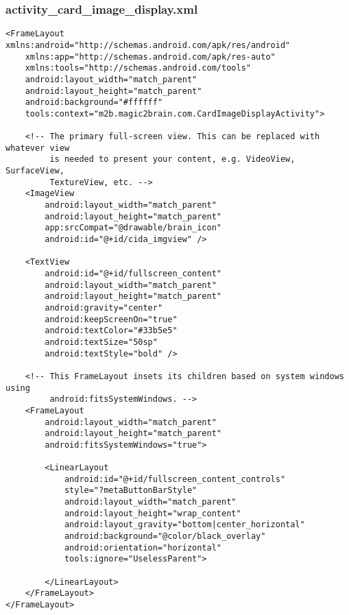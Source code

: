 \subsubsection*{activity\_card\_image\_display.xml}
\begin{lstlisting}
<FrameLayout xmlns:android="http://schemas.android.com/apk/res/android"
    xmlns:app="http://schemas.android.com/apk/res-auto"
    xmlns:tools="http://schemas.android.com/tools"
    android:layout_width="match_parent"
    android:layout_height="match_parent"
    android:background="#ffffff"
    tools:context="m2b.magic2brain.com.CardImageDisplayActivity">

    <!-- The primary full-screen view. This can be replaced with whatever view
         is needed to present your content, e.g. VideoView, SurfaceView,
         TextureView, etc. -->
    <ImageView
        android:layout_width="match_parent"
        android:layout_height="match_parent"
        app:srcCompat="@drawable/brain_icon"
        android:id="@+id/cida_imgview" />

    <TextView
        android:id="@+id/fullscreen_content"
        android:layout_width="match_parent"
        android:layout_height="match_parent"
        android:gravity="center"
        android:keepScreenOn="true"
        android:textColor="#33b5e5"
        android:textSize="50sp"
        android:textStyle="bold" />

    <!-- This FrameLayout insets its children based on system windows using
         android:fitsSystemWindows. -->
    <FrameLayout
        android:layout_width="match_parent"
        android:layout_height="match_parent"
        android:fitsSystemWindows="true">

        <LinearLayout
            android:id="@+id/fullscreen_content_controls"
            style="?metaButtonBarStyle"
            android:layout_width="match_parent"
            android:layout_height="wrap_content"
            android:layout_gravity="bottom|center_horizontal"
            android:background="@color/black_overlay"
            android:orientation="horizontal"
            tools:ignore="UselessParent">

        </LinearLayout>
    </FrameLayout>
</FrameLayout>
\end{lstlisting}

